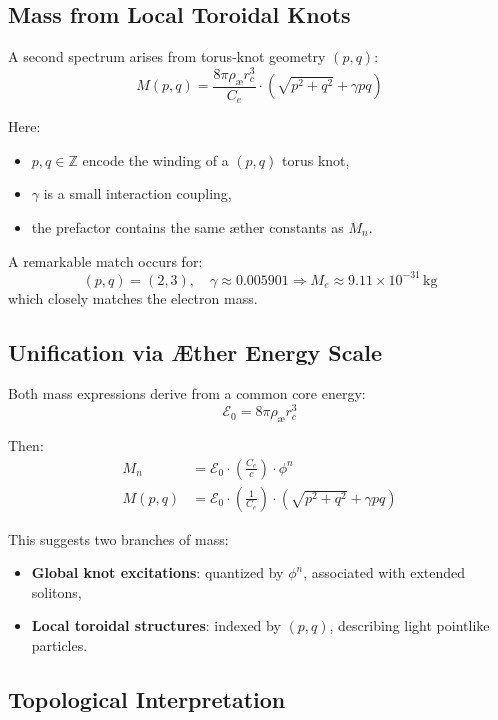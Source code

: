 \subsection{Mass from Local Toroidal Knots}

A second spectrum arises from torus-knot geometry $(p,q)$:
\begin{equation}
M(p,q) = \frac{8\pi \rho_{\text{æ}} r_c^3}{C_e} \cdot \left( \sqrt{p^2 + q^2} + \gamma pq \right)
\end{equation}

Here:
\begin{itemize}
  \item $p, q \in \mathbb{Z}$ encode the winding of a $(p,q)$ torus knot,
  \item $\gamma$ is a small interaction coupling,
  \item the prefactor contains the same æther constants as $M_n$.
\end{itemize}

A remarkable match occurs for:
\[
(p,q) = (2,3), \quad \gamma \approx 0.005901
\Rightarrow M_e \approx 9.11 \times 10^{-31} \, \text{kg}
\]
which closely matches the electron mass.

\subsection{Unification via Æther Energy Scale}

Both mass expressions derive from a common core energy:
\[
\mathcal{E}_0 = 8\pi \rho_{\text{æ}} r_c^3
\]

Then:
\begin{align}
M_n &= \mathcal{E}_0 \cdot \left( \frac{C_e}{c} \right) \cdot \phi^n \\
M(p,q) &= \mathcal{E}_0 \cdot \left( \frac{1}{C_e} \right) \cdot \left( \sqrt{p^2 + q^2} + \gamma pq \right)
\end{align}

This suggests two branches of mass:
\begin{itemize}
  \item \textbf{Global knot excitations}: quantized by $\phi^n$, associated with extended solitons,
  \item \textbf{Local toroidal structures}: indexed by $(p,q)$, describing light pointlike particles.
\end{itemize}

\subsection{Topological Interpretation}

